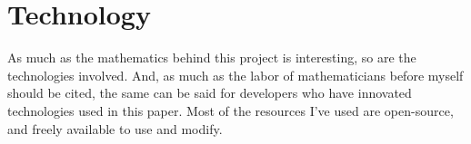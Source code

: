 \section{Technology}

As much as the mathematics behind this project is interesting, so are the technologies involved. And, as much as the
labor of mathematicians before myself should be cited, the same can be said for developers who have innovated
technologies used in this paper. Most of the resources I've used are open-source, and freely available to use and
modify.
